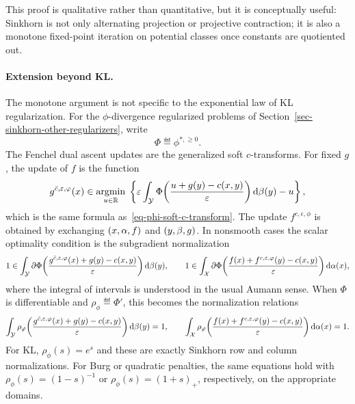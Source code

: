 This proof is qualitative rather than quantitative, but it is conceptually useful: Sinkhorn is not only alternating projection or projective contraction; it is also a monotone fixed-point iteration on potential classes once constants are quotiented out.

\paragraph{Extension beyond KL.}
The monotone argument is not specific to the exponential law of KL regularization. For the $\phi$-divergence regularized problems of Section~\ref{sec-sinkhorn-other-regularizers}, write
\[
	\Phi\eqdef \phi^{*,\geq0}.
\]
The Fenchel dual ascent updates are the generalized soft $c$-transforms. For fixed $g$, the update of $f$ is the function
\[
	g^{\bar c,\varepsilon,\varphi}(x)
	\in
	\underset{u\in\mathbb{R}}{\operatorname{argmin}}\;
	\left\{
		\varepsilon
		\int_{\mathcal{Y}}
		\Phi\!\left(\frac{u+g(y)-c(x,y)}{\varepsilon}\right)
		\mathrm{d}\beta(y)
		-u
	\right\},
\]
which is the same formula as~\eqref{eq-phi-soft-c-transform}. The update $f^{c,\epsilon,\phi}$ is obtained by exchanging $(x,\alpha,f)$ and $(y,\beta,g)$. In nonsmooth cases the scalar optimality condition is the subgradient normalization
\[
	1\in
	\int_{\mathcal{Y}}
	\partial\Phi\!\left(\frac{g^{\bar c,\varepsilon,\varphi}(x)+g(y)-c(x,y)}{\varepsilon}\right)
	\mathrm{d}\beta(y),
	\qquad
	1\in
	\int_{\mathcal{X}}
	\partial\Phi\!\left(\frac{f(x)+f^{c,\varepsilon,\varphi}(y)-c(x,y)}{\varepsilon}\right)
	\mathrm{d}\alpha(x),
\]
where the integral of intervals is understood in the usual Aumann sense. When $\Phi$ is differentiable and $\rho_\phi\eqdef\Phi'$, this becomes the normalization relations
\[
	\int_{\mathcal{Y}}
	\rho_\varphi\!\left(\frac{g^{\bar c,\varepsilon,\varphi}(x)+g(y)-c(x,y)}{\varepsilon}\right)
	\mathrm{d}\beta(y)
	=1,
	\qquad
	\int_{\mathcal{X}}
	\rho_\varphi\!\left(\frac{f(x)+f^{c,\varepsilon,\varphi}(y)-c(x,y)}{\varepsilon}\right)
	\mathrm{d}\alpha(x)
	=1.
\]
For KL, $\rho_\phi(s)=e^s$ and these are exactly Sinkhorn row and column normalizations. For Burg or quadratic penalties, the same equations hold with $\rho_\phi(s)=(1-s)^{-1}$ or $\rho_\phi(s)=(1+s)_+$, respectively, on the appropriate domains.

